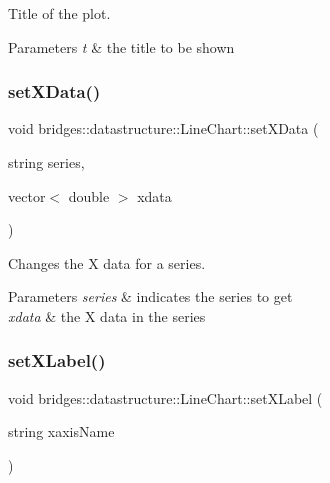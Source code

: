 Title of the plot. 


\begin{DoxyParams}{Parameters}
{\em t} & the title to be shown \\
\hline
\end{DoxyParams}
\mbox{\label{classbridges_1_1datastructure_1_1_line_chart_aa9959489d71e31645f561c4481f050d2}} 
\subsubsection{\texorpdfstring{setXData()}{setXData()}}
{\footnotesize\ttfamily void bridges\+::datastructure\+::\+Line\+Chart\+::set\+X\+Data (\begin{DoxyParamCaption}\item[{string}]{series,  }\item[{vector$<$ double $>$}]{xdata }\end{DoxyParamCaption})\hspace{0.3cm}{\ttfamily [inline]}}



Changes the X data for a series. 


\begin{DoxyParams}{Parameters}
{\em series} & indicates the series to get \\
\hline
{\em xdata} & the X data in the series \\
\hline
\end{DoxyParams}
\mbox{\label{classbridges_1_1datastructure_1_1_line_chart_ab31677353448c66017eb93bf61c087ce}} 
\subsubsection{\texorpdfstring{setXLabel()}{setXLabel()}}
{\footnotesize\ttfamily void bridges\+::datastructure\+::\+Line\+Chart\+::set\+X\+Label (\begin{DoxyParamCaption}\item[{string}]{xaxis\+Name }\end{DoxyParamCaption})\hspace{0.3cm}{\ttfamily [inline]}}



